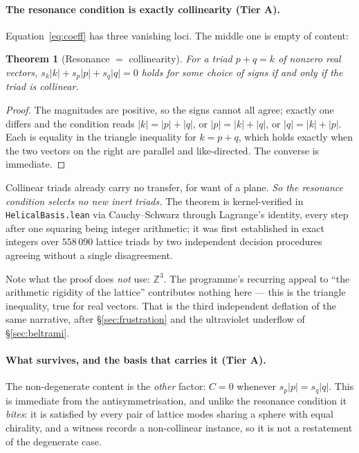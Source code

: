 \documentclass[11pt,a4paper]{article}
\newcommand{\tA}{\textcolor{TierA}{\textbf{Tier A}}}
\newcommand{\Z}{\mathbb{Z}}
\theoremstyle{definition}
\theoremstyle{plain}
\newtheorem{theorem}{Theorem}[section]
\begin{document}
\paragraph{The resonance condition is exactly collinearity (\tA{}).}
Equation~\eqref{eq:coeff} has three vanishing loci. The middle one is empty of content:

\begin{theorem}[Resonance $=$ collinearity]\label{thm:reso}
For a triad $p+q=k$ of nonzero real vectors, $s_k|k|+s_p|p|+s_q|q|=0$ holds for some choice of
signs if and only if the triad is collinear.
\end{theorem}

\begin{proof}
The magnitudes are positive, so the signs cannot all agree; exactly one differs and the condition
reads $|k|=|p|+|q|$, or $|p|=|k|+|q|$, or $|q|=|k|+|p|$. Each is equality in the triangle
inequality for $k=p+q$, which holds exactly when the two vectors on the right are parallel and
like-directed. The converse is immediate.
\end{proof}

Collinear triads already carry no transfer, for want of a plane. \emph{So the resonance condition
selects no new inert triads.} The theorem is kernel-verified in \texttt{HelicalBasis.lean} via
Cauchy--Schwarz through Lagrange's identity, every step after one squaring being integer
arithmetic; it was first established in exact integers over $558\,090$ lattice triads by two
independent decision procedures agreeing without a single disagreement.

Note what the proof does \emph{not} use: $\Z^3$. The programme's recurring appeal to ``the
arithmetic rigidity of the lattice'' contributes nothing here --- this is the triangle inequality,
true for real vectors. That is the third independent deflation of the same narrative, after
\S\ref{sec:frustration} and the ultraviolet underflow of \S\ref{sec:beltrami}.

\paragraph{What survives, and the basis that carries it (\tA{}).}
The non-degenerate content is the \emph{other} factor: $C=0$ whenever $s_p|p|=s_q|q|$. This is
immediate from the antisymmetrisation, and unlike the resonance condition it \emph{bites}: it is
satisfied by every pair of lattice modes sharing a sphere with equal chirality, and a witness
records a non-collinear instance, so it is not a restatement of the degenerate case.
\end{document}
